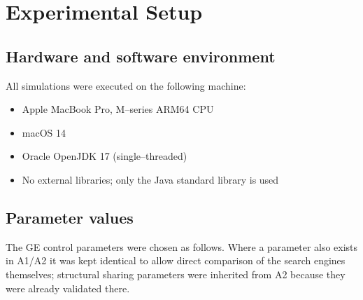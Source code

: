 \documentclass[12pt,a4paper]{article}
\begin{document}
\section{Experimental Setup}

\subsection{Hardware and software environment}
All simulations were executed on the following machine:
\begin{itemize}[leftmargin=2em]
    \item Apple MacBook Pro, M--series ARM64 CPU
    \item macOS 14
    \item Oracle OpenJDK 17 (single--threaded)
    \item No external libraries; only the Java standard library is used
\end{itemize}

\subsection{Parameter values}
The GE control parameters were chosen as follows. Where a parameter
also exists in A1/A2 it was kept identical to allow direct comparison
of the search engines themselves; structural sharing parameters were
inherited from A2 because they were already validated there.
\end{document}
